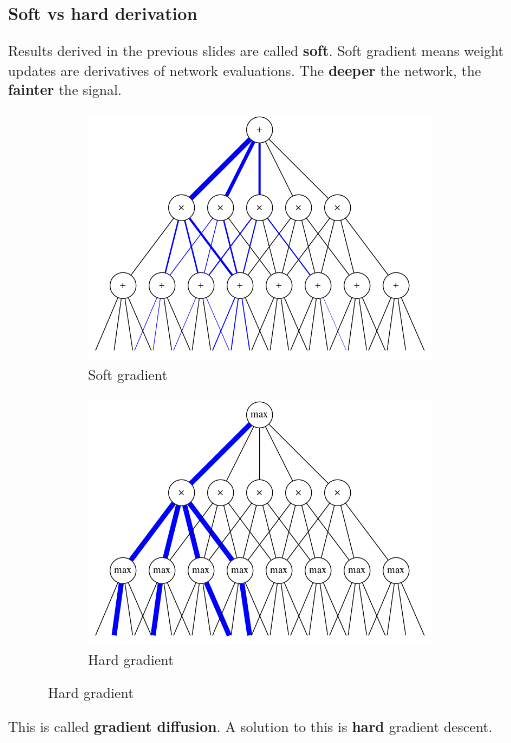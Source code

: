 \documentclass{beamer}
\begin{document}
\begin{frame}
  \frametitle{Soft vs hard derivation}

  Results derived in the previous slides are called \textbf{soft}. Soft gradient means weight
  updates are derivatives of network evaluations. The \textbf{deeper} the network, the
  \textbf{fainter} the signal.

  \begin{figure}[h]
    \centering
    \begin{subfigure}[b]{0.45\linewidth}
      \centering\includegraphics[width=\textwidth]{imgs/softgrad.png}
      \captionsetup{justification=centering}
      \caption{Soft gradient}
    \end{subfigure}
    \begin{subfigure}[b]{0.45\linewidth}
      \centering\includegraphics[width=\textwidth]{imgs/hardgrad.png}
      \captionsetup{justification=centering}
      \caption{Hard gradient}
    \end{subfigure}
  \end{figure}

  This is called \textbf{gradient diffusion}. A solution to this is \textbf{hard} gradient descent.
\end{frame}
\end{document}
